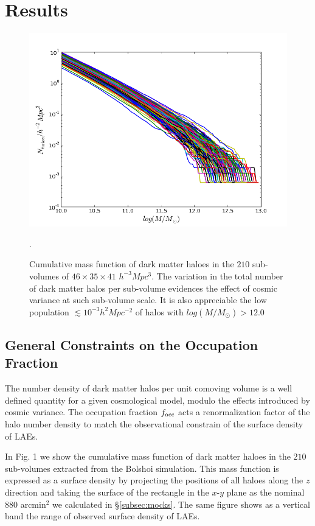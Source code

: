 \documentclass{emulateapj}
\begin{document}
\section{Results}


\begin{figure}
\begin{center}
\includegraphics[width=1.00\linewidth,angle=0]{./plots/cum_halos_tex.png}
\caption{ \label{figure:laes_dist} Cumulative mass function of dark matter haloes in the $210$ sub-volumes of $46\times 35\times 41$ $h^{-3}Mpc^{3}$. The variation in the total number of dark matter halos per sub-volume  evidences the effect of cosmic variance at such sub-volume scale. It is also appreciable the low population $\lesssim10^{-3}h^{2}Mpc^{-2}$ of halos with $log(M/M_{\odot})>12.0$}.
\end{center} 
\end{figure}




\subsection{General Constraints on the Occupation Fraction}
The number density of dark matter halos per unit comoving volume is a well defined quantity for a given cosmological model, modulo the effects introduced by cosmic variance. The occupation fraction $f_{\rm occ}$ acts a renormalization factor of the halo number density to match the observational constrain of the surface density of LAEs.

In Fig. 1 we show the cumulative mass function of dark matter haloes in the $210$ sub-volumes extracted from the Bolshoi simulation. This mass function is expressed as a surface density by projecting the positions of all haloes along the $z$ direction and taking the surface of the rectangle in the $x$-$y$ plane as the nominal $880$ arcmin$^{2}$ we calculated in \S\ref{subsec:mocks}. The same figure shows as a vertical band the range of observed surface density of LAEs. 
\end{document}
